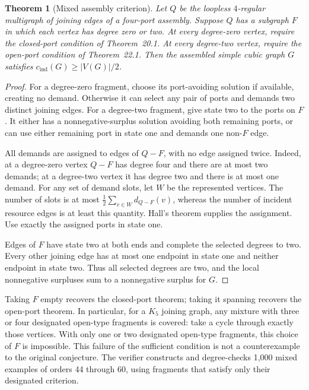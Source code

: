 \documentclass[11pt]{article}
\newtheorem{theorem}{Theorem}[section]
\newcommand{\cind}{c_{\mathrm{ind}}}
\begin{document}
\begin{theorem}[Mixed assembly criterion]\label{thm:mixed-assembly}
Let $Q$ be the loopless $4$-regular multigraph of joining edges of
a four-port assembly. Suppose $Q$ has a subgraph $F$ in which each
vertex has degree zero or two. At every degree-zero vertex, require
the closed-port condition of Theorem~20.1. At every degree-two
vertex, require the open-port condition of Theorem~22.1. Then
the assembled simple cubic graph $G$ satisfies
$\cind(G)\geq |V(G)|/2$.
\end{theorem}
\begin{proof}
For a degree-zero fragment, choose its port-avoiding solution if
available, creating no demand. Otherwise it can select any pair
of ports and demands two distinct joining edges. For a degree-two
fragment, give state two to the ports on $F$. It either has a
nonnegative-surplus solution avoiding both remaining ports, or can
use either remaining port in state one and demands one non-$F$ edge.

All demands are assigned to edges of $Q-F$, with no edge assigned
twice. Indeed, at a degree-zero vertex $Q-F$ has degree four and
there are at most two demands; at a degree-two vertex it has degree
two and there is at most one demand. For any set of demand slots,
let $W$ be the represented vertices. The number of slots is at most
$\tfrac12\sum_{v\in W}d_{Q-F}(v)$, whereas the number of incident
resource edges is at least this quantity. Hall's theorem supplies
the assignment. Use exactly the assigned ports in state one.

Edges of $F$ have state two at both ends and complete the selected
degrees to two. Every other joining edge has at most one endpoint
in state one and neither endpoint in state two. Thus all selected
degrees are two, and the local nonnegative surpluses sum to a
nonnegative surplus for $G$.
\end{proof}

Taking $F$ empty recovers the closed-port theorem; taking it spanning
recovers the open-port theorem. In particular, for a $K_5$ joining
graph, any mixture with three or four designated open-type fragments
is covered: take a cycle through exactly those vertices. With only
one or two designated open-type fragments, this choice of $F$ is
impossible. This failure of the sufficient condition is not a
counterexample to the original conjecture. The verifier constructs
and degree-checks 1,000 mixed examples of orders 44 through 60,
using fragments that satisfy only their designated criterion.
\end{document}
